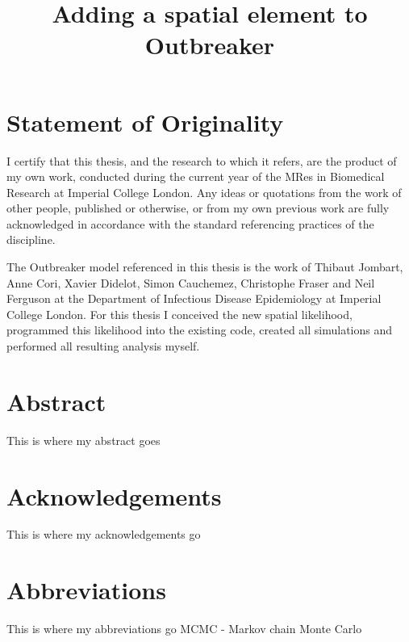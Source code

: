 \documentclass[11pt,a4paper]{report}
\title{Adding a spatial element to Outbreaker}
\begin{document}
\maketitle
\chapter*{Statement of Originality}
\thispagestyle{empty}
\noindent I certify that this thesis, and the research to which it refers, are the product of my own work, conducted during the current year of the MRes in Biomedical Research at Imperial College London. Any ideas or quotations from the work of other people, published or otherwise, or from my own previous work are fully acknowledged in accordance with the standard referencing practices of the discipline. 


The Outbreaker model referenced in this thesis is the work of Thibaut Jombart, Anne Cori, Xavier Didelot, Simon Cauchemez, Christophe Fraser and Neil Ferguson at the Department of Infectious Disease Epidemiology at Imperial College London. For this thesis I conceived the new spatial likelihood, programmed this likelihood into the existing code, created all simulations and performed all resulting analysis myself.
\newpage

\chapter*{Abstract}
\thispagestyle{empty}
This is where my abstract goes
\newpage

\chapter*{Acknowledgements}
\thispagestyle{empty}
This is where my acknowledgements go
\newpage

\tableofcontents
\pagestyle{plain}
\newpage

\chapter*{Abbreviations}
\thispagestyle{empty}
This is where my abbreviations go
MCMC - Markov chain Monte Carlo
\newpage
\end{document}
